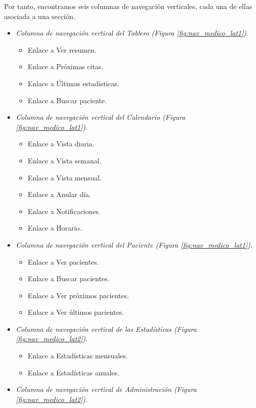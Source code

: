 \documentclass[a4paper,oneside,11pt]{book}
\begin{document}
			Por tanto, encontramos seis columnas de navegación verticales, cada una de ellas asociada a una sección.
			\begin{itemize}
				\item \textit{Columna de navegación vertical del Tablero (Figura \ref{fig:nav_medico_lat1})}. 
					\begin{itemize}
						\item Enlace a Ver resumen.
						\item Enlace a Próximas citas.
						\item Enlace a Últimas estadísticas.
						\item Enlace a Buscar paciente.
					\end{itemize}
				\item \textit{Columna de navegación vertical del Calendario (Figura \ref{fig:nav_medico_lat1})}.
					\begin{itemize}
						\item Enlace a Vista diaria.
						\item Enlace a Vista semanal.
						\item Enlace a Vista mensual.
						\item Enlace a Anular día.
						\item Enlace a Notificaciones.
						\item Enlace a Horario.
					\end{itemize}
				\item \textit{Columna de navegación vertical del Paciente (Figura \ref{fig:nav_medico_lat1})}.
					\begin{itemize}
						\item Enlace a Ver pacientes.
						\item Enlace a Buscar pacientes.
						\item Enlace a Ver próximos pacientes.
						\item Enlace a Ver últimos pacientes.
					\end{itemize}
				\item \textit{Columna de navegación vertical de las Estadísticas (Figura \ref{fig:nav_medico_lat2})}.
					\begin{itemize}
						\item Enlace a Estadísticas mensuales.
						\item Enlace a Estadísticas anuales.
					\end{itemize}
				\item \textit{Columna de navegación vertical de Administración (Figura \ref{fig:nav_medico_lat2})}.

\end{itemize}
\end{document}
